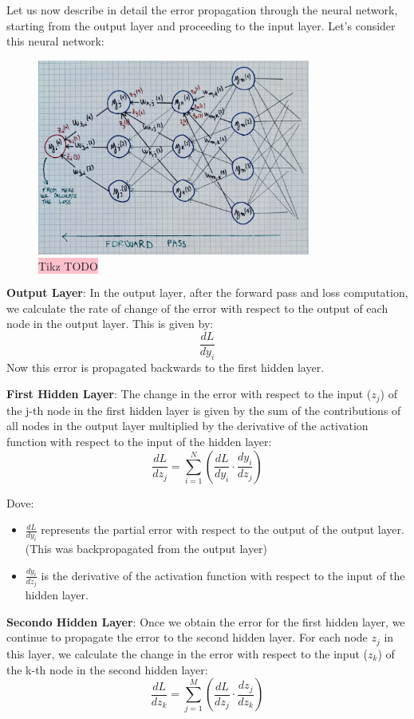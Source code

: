 Let us now describe in detail the error propagation through the neural network, starting from the output layer and proceeding to the input layer. Let's consider this neural network:

\begin{figure}[htbp]
\centering
\includegraphics[width=0.8\textwidth]{tikz/chapter3 - Backpropagation.jpg}
\caption{\color{red}\colorbox{pink}{Tikz TODO}}
\end{figure}

\textbf{Output Layer}: In the output layer, after the forward pass and loss computation, we calculate the rate of change of the error with respect to the output of each node in the output layer. This is given by:
\[ \frac{d L}{d y_i} \]
Now this error is propagated backwards to the first hidden layer.

\textbf{First Hidden Layer}:
The change in the error with respect to the input (\( z_j \)) of the j-th node in the first hidden layer is given by the sum of the contributions of all nodes in the output layer multiplied by the derivative of the activation function with respect to the input of the hidden layer:
\[ \frac{d L}{d z_j} = \sum_{i=1}^{N} \left( \frac{d L}{d y_i} \cdot \frac{d y_i}{d z_j} \right) \]

Dove:
\begin{itemize}
    \item \( \frac{d L}{d y_i} \) represents the partial error with respect to the output of the output layer. (\textcolor{myred}{This was backpropagated from the output layer})
    \item \( \frac{d y_i}{d z_j} \) is the derivative of the activation function with respect to the input of the hidden layer.
\end{itemize}

\textbf{Secondo Hidden Layer}:
Once we obtain the error for the first hidden layer, we continue to propagate the error to the second hidden layer. For each node \( z_j \) in this layer, we calculate the change in the error with respect to the input (\( z_k \)) of the k-th node in the second hidden layer:
\[ \frac{d L}{d z_k} = \sum_{j=1}^{M} \left( \frac{d L}{d z_j} \cdot \frac{d z_j}{d z_k} \right) \]

